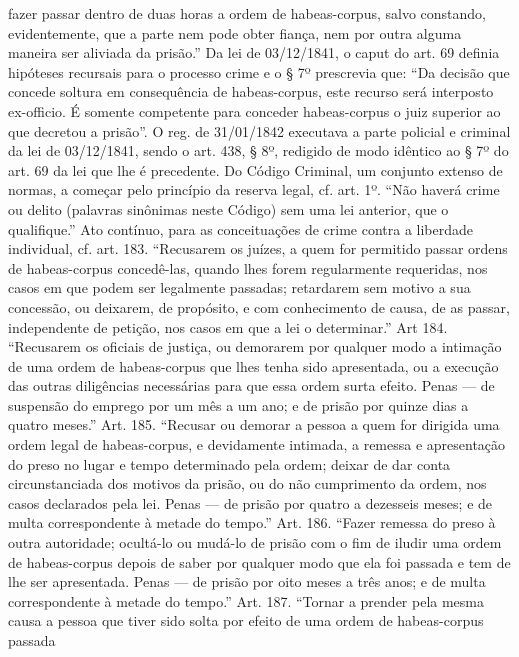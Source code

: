{  fazer passar dentro de duas horas a ordem de habeas-corpus, salvo
  constando, evidentemente, que a parte nem pode obter fiança, nem por
  outra alguma maneira ser aliviada da prisão.'' Da lei de 03/12/1841, o
  caput do art. 69 definia hipóteses recursais para o processo crime e o
  § 7º prescrevia que: ``Da decisão que concede soltura em consequência
  de habeas-corpus, este recurso será interposto ex-officio. É somente
  competente para conceder habeas-corpus o juiz superior ao que decretou
  a prisão''. O reg. de 31/01/1842 executava a parte policial e criminal
  da lei de 03/12/1841, sendo o art. 438, § 8º, redigido de modo
  idêntico ao § 7º do art. 69 da lei que lhe é precedente. Do Código
  Criminal, um conjunto extenso de normas, a começar pelo princípio da
  reserva legal, cf. art. 1º. ``Não haverá crime ou delito (palavras
  sinônimas neste Código) sem uma lei anterior, que o qualifique.'' Ato
  contínuo, para as conceituações de crime contra a liberdade
  individual, cf. art. 183. ``Recusarem os juízes, a quem for permitido
  passar ordens de habeas-corpus concedê-las, quando lhes forem
  regularmente requeridas, nos casos em que podem ser legalmente
  passadas; retardarem sem motivo a sua concessão, ou deixarem, de
  propósito, e com conhecimento de causa, de as passar, independente de
  petição, nos casos em que a lei o determinar.'' Art 184. ``Recusarem
  os oficiais de justiça, ou demorarem por qualquer modo a intimação de
  uma ordem de habeas-corpus que lhes tenha sido apresentada, ou a
  execução das outras diligências necessárias para que essa ordem surta
  efeito. Penas --- de suspensão do emprego por um mês a um ano; e de
  prisão por quinze dias a quatro meses.'' Art. 185. ``Recusar ou
  demorar a pessoa a quem for dirigida uma ordem legal de habeas-corpus,
  e devidamente intimada, a remessa e apresentação do preso no lugar e
  tempo determinado pela ordem; deixar de dar conta circunstanciada dos
  motivos da prisão, ou do não cumprimento da ordem, nos casos
  declarados pela lei. Penas --- de prisão por quatro a dezesseis meses; e
  de multa correspondente à metade do tempo.'' Art. 186. ``Fazer remessa
  do preso à outra autoridade; ocultá-lo ou mudá-lo de prisão com o fim
  de iludir uma ordem de habeas-corpus depois de saber por qualquer modo
  que ela foi passada e tem de lhe ser apresentada. Penas --- de prisão
  por oito meses a três anos; e de multa correspondente à metade do
  tempo.'' Art. 187. ``Tornar a prender pela mesma causa a pessoa que
  tiver sido solta por efeito de uma ordem de habeas-corpus passada
}
